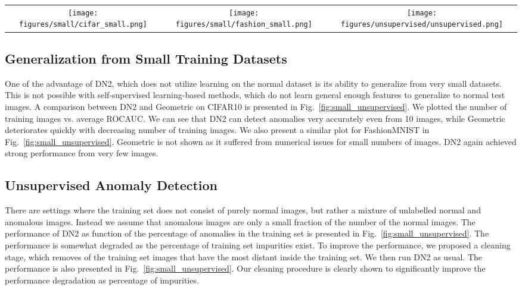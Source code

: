 \documentclass{article}
\begin{document}
\begin{figure*}
  \centering

    \begin{tabular}{ccc}

   \texttt{[image: figures/small/cifar\_small.png]} & \texttt{[image: figures/small/fashion\_small.png]} & \texttt{[image: figures/unsupervised/unsupervised.png]} 
    \end{tabular}
    \caption{Number of training images vs. ROCAUC (left) CIFAR10 - Strong perfromance is achieved by DN2 even from 10 images, whereas Geometric deteriorates critically. (center) FashionMNIST - similarly strong performance by DN2. (right) Impurity ratio vs ROCAUC on CIFAR10. The training set cleaning procedure, significantly improves performance.}
    \label{fig:small_unsupervised}
\end{figure*}



\subsection{Generalization from Small Training Datasets}
\label{subsec:exp:small}

One of the advantage of DN2, which does not utilize learning on the normal dataset is its ability to generalize from very small datasets. This is not possible with self-supervised learning-based methods, which do not learn general enough features to generalize to normal test images. A comparison between DN2 and Geometric on CIFAR10 is presented in Fig.~\ref{fig:small_unsupervised}. We plotted the number of training images vs. average ROCAUC. We can see that DN2 can detect anomalies very accurately even from 10 images, while Geometric deteriorates quickly with decreasing number of training images. We also present a similar plot for FashionMNIST in Fig.~\ref{fig:small_unsupervised}. Geometric is not shown as it suffered from numerical issues for small numbers of images. DN2 again achieved strong performance from very few images.

\subsection{Unsupervised Anomaly Detection}
\label{subsec:exp:unsupervised}

There are settings where the training set does not consist of purely normal images, but rather a mixture of unlabelled normal and anomalous images. Instead we assume that anomalous images are only a small fraction of the number of the normal images. The performance of DN2 as function of the percentage of anomalies in the training set is presented in Fig.~\ref{fig:small_unsupervised}. The performance is somewhat degraded as the percentage of training set impurities exist. To improve the performance, we proposed a cleaning stage, which removes  of the training set images that have the most distant  inside the training set. We then run DN2 as usual. The performance is also presented in Fig.~\ref{fig:small_unsupervised}. Our cleaning procedure is clearly shown to significantly improve the performance degradation as percentage of impurities.
\end{document}
